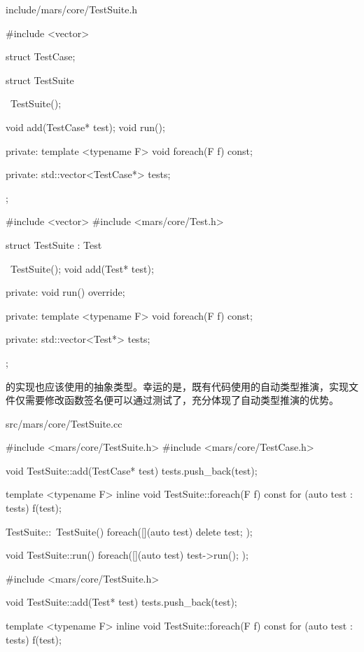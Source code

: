 \begin{content}
\begin{diff}{include/mars/core/TestSuite.h}
 \begin{minicpp}
#include <vector>

struct TestCase;

struct TestSuite {
  ~TestSuite();

  void add(TestCase* test);
  void run();

private:
  template <typename F>
  void foreach(F f) const;

private:
  std::vector<TestCase*> tests;
};
 \end{minicpp}
\tcblower
 \begin{minicpp}
#include <vector>
#include <mars/core/Test.h>

struct TestSuite : Test {
  ~TestSuite();
  void add(Test* test);

private:
  void run() override;

private:
  template <typename F>
  void foreach(F f) const;

private:
  std::vector<Test*> tests;
};
 \end{minicpp}
\end{diff}

的实现也应该使用的抽象类型。幸运的是，既有代码使用的自动类型推演，实现文件仅需要修改函数签名便可以通过测试了，充分体现了自动类型推演的优势。

\begin{diff}{src/mars/core/TestSuite.cc}
 \begin{minicpp}
#include <mars/core/TestSuite.h>
#include <mars/core/TestCase.h>

void TestSuite::add(TestCase* test) {
  tests.push_back(test);
}

template <typename F>
inline void TestSuite::foreach(F f) const {
  for (auto test : tests) {
    f(test);
  }
}

TestSuite::~TestSuite() {
  foreach([](auto test) {
    delete test;
  });
}

void TestSuite::run() {
  foreach([](auto test) {
    test->run();
  });
} 
 \end{minicpp}
\tcblower
 \begin{minicpp}
#include <mars/core/TestSuite.h>

void TestSuite::add(Test* test) {
  tests.push_back(test);
}

template <typename F>
inline void TestSuite::foreach(F f) const {
  for (auto test : tests) {
    f(test);
  }
}


\end{minicpp}
\end{diff}
\end{content}
